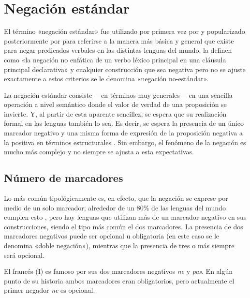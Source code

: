 \section*{Negación estándar}

\noindent El término «negación estándar» fue utilizado por primera vez por \textcolor{MidnightBlue}{\citet{Payne85}} y popularizado posteriormente por \textcolor{MidnightBlue}{\citet{Miestamo2005}} para referirse a la manera más básica y general que existe para negar predicados verbales en las distintas lenguas del mundo. \textcolor{MidnightBlue}{\citet{Auwera2020}} la definen como «la negación no enfática de un verbo léxico principal en una cláusula principal declarativa» y cualquier construcción que sea negativa pero no se ajuste exactamente a estos criterios se le denomina «negación no-estándar».

La negación estándar consiste —en términos muy generales— en una sencilla operación a nivel semántico donde el valor de verdad de una proposición se invierte. Y, al partir de esta aparente sencillez, se espera que su realización formal en las lenguas también lo sea. Es decir, se espera la presencia de un único marcador negativo y una misma forma de expresión de la proposición negativa a la positiva en términos estructurales \textcolor{MidnightBlue}{\citep{Auwera2020}}. Sin embargo, el fenómeno de la negación es mucho más complejo y no siempre se ajusta a esta expectativas.

\subsection*{Número de marcadores}

\noindent Lo más común tipológicamente es, en efecto, que la negación se exprese por medio de un solo marcador; alrededor de un 80\% de las lenguas del mundo cumplen esto \textcolor{MidnightBlue}{\citep{VanAlsenoy2014,morfemas,Vossen2016}}, pero hay lenguas que utilizan más de un marcador negativo en sus construcciones, siendo el tipo más común el dos marcadores. La presencia de dos marcadores negativos puede ser opcional u obligatoria (en este caso se le denomina «doble negación»), mientras que la presencia de tres o más siempre será opcional.

El francés (I) es famoso por sus dos marcadores negativos {\setmainfont{Charis SIL} \textit{ne}} y {\setmainfont{Charis SIL} \textit{pas}}. En algún punto de su historia ambos marcadores eran obligatorios, pero actualmente el primer negador {\setmainfont{Charis SIL} \textit{ne}} es opcional. \vspace{0.5cm}

